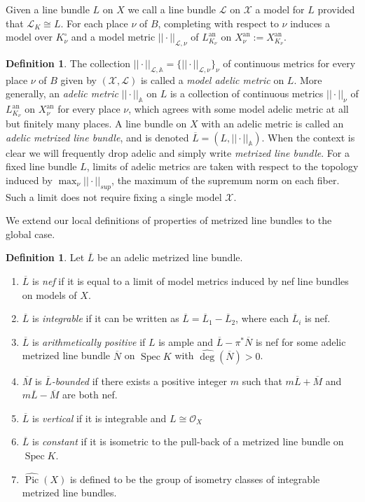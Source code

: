 \documentclass[times, doublespace]{amsart}
\numberwithin{equation}{section}
\theoremstyle{plain}
\theoremstyle{definition}
\newtheorem{definition}[equation]{Definition}
\DeclareMathOperator{\Spec}{Spec}
\DeclareMathOperator{\Pic}{Pic}
\DeclareMathOperator{\an}{an}
\newcommand{\semipositive}{nef}
\newcommand{\A}{\mathbb{A}}
\newcommand{\cO}{\mathcal{O}}
\newcommand{\cX}{\mathcal{X}}
\newcommand{\calL}{\mathcal{L}}
\begin{document}
Given a line bundle $L$ on $X$ we call a line bundle $\calL$ on $\cX$ a model for $L$ provided that $\calL_K\cong L$. For each place $\nu$ of $B$, completing with respect to $\nu$ induces a model over $K_{\nu}^{\circ}$ and a model metric $||\cdot||_{\calL,\nu}$ of $L^{\an}_{K_{\nu}}$ on $X^{\an}_{\nu}:=X^{\an}_{K_{\nu}}$.

\begin{definition}
The collection $||\cdot||_{\calL,\A}=\{||\cdot||_{\calL,\nu}\}_{\nu}$ of continuous metrics for every place $\nu$ of $B$ given by $(\cX,\calL)$ is called a \emph{model adelic metric} on $L$. More generally, an \emph{adelic metric} $||\cdot||_{\A}$ on $L$ is a collection of continuous metrics $||\cdot||_{\nu}$ of $L^{\an}_{K_{\nu}}$ on $X^{\an}_{\nu}$ for every place $\nu$, which agrees with some model adelic metric at all but finitely many places. A line bundle on $X$ with an adelic metric is called an \emph{adelic metrized line bundle}, and is denoted $\overline L=(L,||\cdot||_{\A})$. When the context is clear we will frequently drop adelic and simply write \emph{metrized line bundle}. For a fixed line bundle $L$, limits of adelic metrics are taken with respect to the topology induced by $\max_{\nu}||\cdot||_{sup}$, the maximum of the supremum norm on each fiber. Such a limit does not require fixing a single model $\cX$.
\end{definition}



We extend our local definitions of properties of metrized line bundles to the global case.
\begin{definition}
Let $\overline L$ be an adelic metrized line bundle.
\begin{enumerate}

\item
$\overline L$ is \emph{nef} if it is equal to a limit of model metrics induced by nef line bundles on models of $X$.

\item 
$\overline L$ is \emph{integrable} if it can be written as $\overline L=\overline L_1-\overline L_2$, where each $\overline L_i$ is nef.


\item
$\overline L$ is \emph{arithmetically positive} if $L$ is ample and $\overline L-\pi^*\overline N$ is nef for some adelic metrized line bundle $\overline N$ on $\Spec K$ with $\widehat{\deg}(\overline N)>0$.
\item
$\overline M$ is \emph{$\overline L$-bounded} if there exists a positive integer $m$ such that $m\overline L+\overline M$ and $m\overline L-\overline M$ are both \semipositive{}.
\item
$\overline L$ is \emph{vertical} if it is integrable and $L\cong\cO_X$
\item
$\overline L$ is \emph{constant} if it is isometric to the pull-back of a metrized line bundle on $\Spec K$.
\item
$\widehat{\Pic}(X)$ is defined to be the group of isometry classes of integrable metrized line bundles.


\end{enumerate}
\end{definition}
\end{document}
